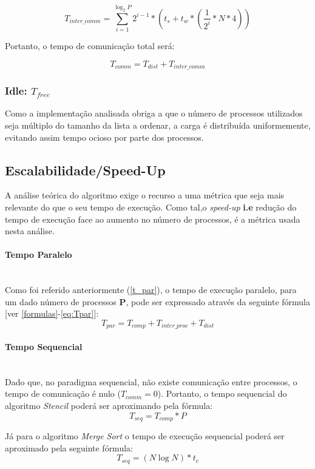 \documentclass{article}
\begin{document}
$$ T_{inter\_comm} = \sum_{i=1}^{\log_{2}P}{2^{i-1} * (t_s + t_w * (\frac{1}{2^i}*N*4))} $$

Portanto, o tempo de comunicação total será:

$$T_{comm} = T_{dist} + T_{inter\_comm}$$

\subsubsection{Idle: $T_{free}$}

Como a implementação analisada obriga a que o número de processos utilizados seja múltiplo do tamanho da lista a ordenar, a carga é distribuída uniformemente, evitando assim tempo ocioso por parte dos processos.

\subsection{Escalabilidade/Speed-Up}
A análise teórica do algoritmo exige o recurso a uma métrica que seja mais relevante do
que o seu tempo de execução. Como tal,o \textit{speed-up} \textbf{i.e}
redução do tempo de execução face ao aumento no número de processos, é a métrica usada
nesta análise.

\paragraph{Tempo Paralelo}\mbox{}\\

Como foi referido anteriormente (\ref{t_par}), o tempo de execução paralelo, para um 
dado número de processos \textbf{P}, pode ser expressado através da seguinte fórmula [ver \ref{formulas}-\ref{eq:Tpar}]:
$$T_{par} = T_{comp} + T_{inter\_proc} + T_{dist}$$

\paragraph{Tempo Sequencial}\mbox{}\\

Dado que, no paradigma sequencial, não existe comunicação entre processos, o tempo de comunicação é nulo ($T_{comm}=0$). Portanto, o tempo sequencial do algoritmo \textit{Stencil} poderá ser aproximando pela fórmula:
$$T_{seq}=T_{comp}*P$$

Já para o algoritmo \textit{Merge Sort} o tempo de execução sequencial poderá ser aproximado pela seguinte fórmula:
$$T_{seq}= (N \log{N})*t_c$$
\end{document}
